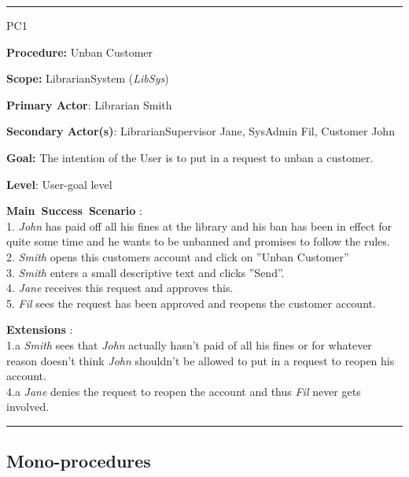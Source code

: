 \vspace{0.5cm}
\hrule
\begin{lyxlist}{PC1}
\small{
\item [\textbf{Procedure:}] Unban Customer
\item [\textbf{Scope:}] LibrarianSystem (\emph{LibSys})
\item [\textbf{Primary Actor}:] Librarian Smith
\item [\textbf{Secondary Actor(s)}:] LibrarianSupervisor Jane, SysAdmin Fil,
Customer John
\item [\textbf{Goal:}] The intention of the User is to put in a request to unban
a customer.
\item [\textbf{Level}:] User-goal level
\item [\textbf{Main~Success~Scenario}]:\\
1. \emph{John} has paid off all his fines at the library and his ban has been
in effect for quite some time and he wants to be unbanned and promises to
follow the rules.\\
2. \emph{Smith} opens this customers account and click on ''Unban Customer''\\
3. \emph{Smith} enters a small descriptive text and clicks ''Send''.\\
4. \emph{Jane} receives this request and approves this.\\
5. \emph{Fil} sees the request has been approved and reopens the customer
account.\\

\item [\textbf{Extensions}]:\\
1.a \emph{Smith} sees that \emph{John} actually hasn't paid of all his fines or
for whatever reason doesn't think \emph{John} shouldn't be allowed to put in a
request to reopen his account.\\
4.a \emph{Jane} denies the request to reopen the account and thus \emph{Fil}
never gets involved.\\
}

\end{lyxlist}
\hrule

\subsection{Mono-procedures}

